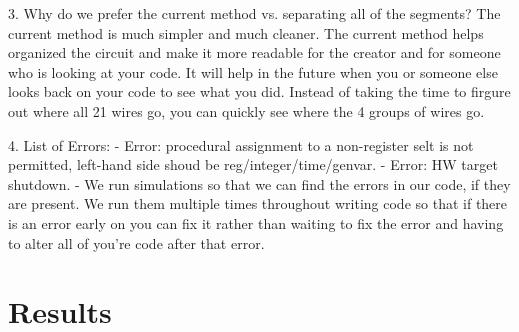 \documentclass[11pt]{article}
\begin{document}
3. Why do we prefer the current method vs. separating all of the segments? \newline
The current method is much simpler and much cleaner. The current method helps organized the circuit and make it more readable for the creator and for someone who is looking at your code. It will help in the future when you or someone else looks back on your code to see what you did. Instead of taking the time to firgure out where all 21 wires go, you can quickly see where the 4 groups of wires go. \newline

4. List of Errors: \newline 
- Error: procedural assignment to a non-register selt is not permitted, left-hand side shoud be reg/integer/time/genvar. \newline
- Error: HW target shutdown. \newline
- We run simulations so that we can find the errors in our code, if they are present. We run them multiple times throughout writing code so that if there is an error early on you can fix it rather than waiting to fix the error and having to alter all of you're code after that error. 


\section*{Results}
\end{document}
